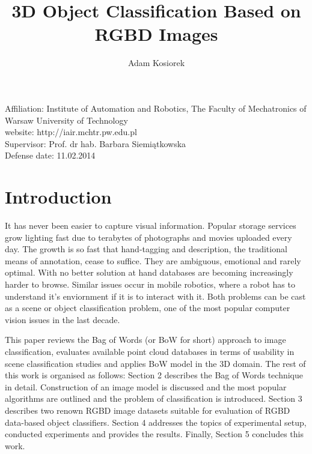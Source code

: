 \documentclass[12pt]{article}
\begin{document}
\title{3D Object Classification Based on RGBD Images}
\author{Adam Kosiorek}
\maketitle
Affiliation: Institute of Automation and Robotics, The Faculty of Mechatronics 
of Warsaw University of Technology \\
website: http://iair.mchtr.pw.edu.pl \\
Supervisor: Prof. dr hab. Barbara Siemiątkowska \\
Defense date: 11.02.2014


\section{ Introduction }

  It has never been easier to capture visual information. Popular storage 
services grow lighting fast due to terabytes of photographs and movies uploaded 
every day. The growth is so fast that hand-tagging and description, the 
traditional means of annotation, cease to suffice. They are ambiguous, 
emotional and rarely optimal. With no better solution at hand databases are 
becoming increasingly harder to browse. Similar issues occur in mobile 
robotics, where a robot has to understand it's enviornment if it is to interact 
with it. Both problems can be cast as a scene or object classification problem, 
one of the most popular computer vision issues in the last decade. 

  This paper reviews the Bag of Words (or BoW for short) approach to image 
classification, evaluates available point cloud databases in terms of usability 
in scene classification studies and applies BoW model in the 3D domain. The 
rest of this work is organised as follows: Section 2 describes the Bag of Words 
technique in detail. Construction of an image model is discussed and the most 
popular algorithms are outlined and the problem of classification is 
introduced. Section 3 describes two renown RGBD image datasets suitable for 
evaluation of RGBD data-based object classifiers. Section 4 addresses the 
topics of experimental setup, conducted experiments and provides the results. 
Finally, Section 5 concludes this work.
\end{document}
